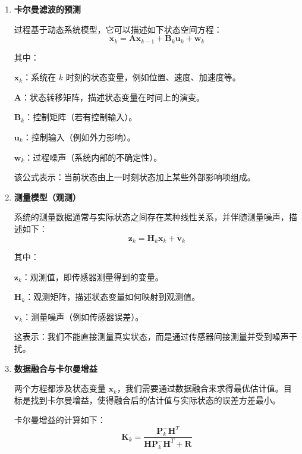 \begin{enumerate}
    \item \textbf{卡尔曼滤波的预测}
    
    过程基于动态系统模型，它可以描述如下状态空间方程：
    \begin{equation*}
        \mathbf{x}_k = \mathbf{A} \mathbf{x}_{k-1} + \mathbf{B}_k \mathbf{u}_k + \mathbf{w}_k
    \end{equation*}
    
    其中：
    
    $\mathbf{x}_k$：系统在 $k$ 时刻的状态变量，例如位置、速度、加速度等。
    
    $\mathbf{A}$：状态转移矩阵，描述状态变量在时间上的演变。
    
    $\mathbf{B}_k$：控制矩阵（若有控制输入）。
    
    $\mathbf{u}_k$：控制输入（例如外力影响）。
    
    $\mathbf{w}_k$：过程噪声（系统内部的不确定性）。

    该公式表示：当前状态由上一时刻状态加上某些外部影响项组成。

    \item \textbf{测量模型（观测）}

    系统的测量数据通常与实际状态之间存在某种线性关系，并伴随测量噪声，描述如下：
    \begin{equation}
        \mathbf{z}_k = \mathbf{H}_k \mathbf{x}_k + \mathbf{v}_k
    \end{equation}

    其中：

    $\mathbf{z}_k$：观测值，即传感器测量得到的变量。

    $\mathbf{H}_k$：观测矩阵，描述状态变量如何映射到观测值。

    $\mathbf{v}_k$：测量噪声（例如传感器误差）。

    这表示：我们不能直接测量真实状态，而是通过传感器间接测量并受到噪声干扰。

    \item \textbf{数据融合与卡尔曼增益}

    两个方程都涉及状态变量 $\mathbf{x}_k$，我们需要通过数据融合来求得最优估计值。目标是找到卡尔曼增益，使得融合后的估计值与实际状态的误差方差最小。

    卡尔曼增益的计算如下：
    \begin{equation}
        \mathbf{K}_k = \frac{\mathbf{P}_{k}^- \mathbf{H}^T}{\mathbf{H} \mathbf{P}_{k}^- \mathbf{H}^T + \mathbf{R}}
    \end{equation}


\end{enumerate}
